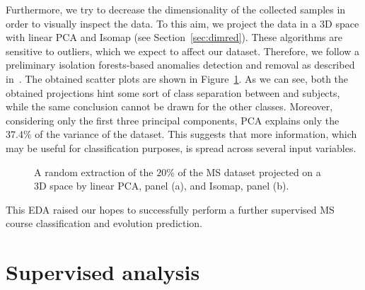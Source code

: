 Furthermore, we try to decrease the dimensionality of the collected samples in order to visually inspect the data. To this aim, we project the data in a 3D space with linear PCA and Isomap (see Section~\ref{sec:dimred}).
These algorithms are sensitive to outliers, which we expect to affect our dataset. Therefore, we follow a preliminary isolation forests-based anomalies detection and removal as described in~\cite{liu2008isolation, liu2012isolation}.
The obtained scatter plots are shown in Figure~\ref{fig:ms_3dscatterplot}.
As we can see, both the obtained projections hint some sort of class separation between \RR and \SP subjects, while the same conclusion cannot be drawn for the other classes. Moreover, considering only the first three principal components, PCA explains only the $37.4\%$ of the variance of the dataset. This suggests that more information, which may be useful for classification purposes, is spread across several input variables.

\begin{figure}[h!]
	\centering
	\caption{A random extraction of the $20\%$ of the MS dataset projected on a 3D space by linear PCA, panel (a), and Isomap, panel (b).} \label{fig:ms_3dscatterplot}
\end{figure}

This EDA raised our hopes to successfully perform a further supervised MS course classification and evolution prediction.



\section{Supervised analysis}\label{sec:problem_description}


